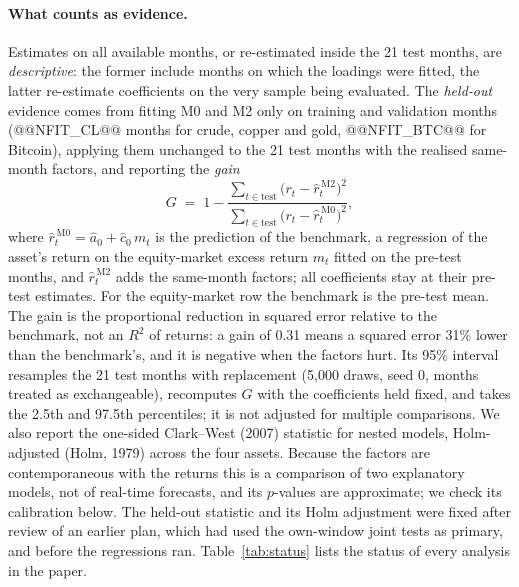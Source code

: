 \documentclass[11pt]{article}
\begin{document}
\paragraph{What counts as evidence.} Estimates on all available months, or re-estimated inside the 21 test months, are \emph{descriptive}: the former include months on which the loadings were fitted, the latter re-estimate coefficients on the very sample being evaluated. The \emph{held-out} evidence comes from fitting M0 and M2 only on training and validation months (@@NFIT_CL@@ months for crude, copper and gold, @@NFIT_BTC@@ for Bitcoin), applying them unchanged to the 21 test months with the realised same-month factors, and reporting the \emph{gain}
\[
G \;=\; 1-\frac{\sum_{t\in\text{test}}\bigl(r_t-\hat r^{\,\mathrm{M2}}_t\bigr)^2}{\sum_{t\in\text{test}}\bigl(r_t-\hat r^{\,\mathrm{M0}}_t\bigr)^2},
\]
where $\hat r^{\,\mathrm{M0}}_t=\hat a_0+\hat c_0\,m_t$ is the prediction of the benchmark, a regression of the asset's return on the equity-market excess return $m_t$ fitted on the pre-test months, and $\hat r^{\,\mathrm{M2}}_t$ adds the same-month factors; all coefficients stay at their pre-test estimates. For the equity-market row the benchmark is the pre-test mean. The gain is the proportional reduction in squared error relative to the benchmark, not an $R^2$ of returns: a gain of 0.31 means a squared error 31\% lower than the benchmark's, and it is negative when the factors hurt. Its 95\% interval resamples the 21 test months with replacement (5{,}000 draws, seed 0, months treated as exchangeable), recomputes $G$ with the coefficients held fixed, and takes the 2.5th and 97.5th percentiles; it is not adjusted for multiple comparisons. We also report the one-sided Clark--West (2007) statistic for nested models, Holm-adjusted (Holm, 1979) across the four assets. Because the factors are contemporaneous with the returns this is a comparison of two explanatory models, not of real-time forecasts, and its $p$-values are approximate; we check its calibration below. The held-out statistic and its Holm adjustment were fixed after review of an earlier plan, which had used the own-window joint tests as primary, and before the regressions ran. Table~\ref{tab:status} lists the status of every analysis in the paper.
\end{document}
